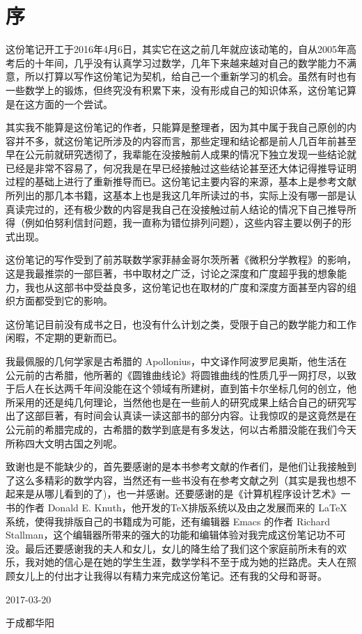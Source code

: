 
\chapter*{序}

这份笔记开工于2016年4月6日，其实它在这之前几年就应该动笔的，自从2005年高考后的十年间，几乎没有认真学习过数学，几年下来越来越对自己的数学能力不满意，所以打算以写作这份笔记为契机，给自己一个重新学习的机会。虽然有时也有一些数学上的锻炼，但终究没有积累下来，没有形成自己的知识体系，这份笔记算是在这方面的一个尝试。

其实我不能算是这份笔记的作者，只能算是整理者，因为其中属于我自己原创的内容并不多，就这份笔记所涉及的内容而言，那些定理和结论都是前人几百年前甚至早在公元前就研究透彻了，我辈能在没接触前人成果的情况下独立发现一些结论就已经是非常不容易了，何况我是在早已经接触过这些结论甚至还大体记得推导证明过程的基础上进行了重新推导而已。这份笔记主要内容的来源，基本上是参考文献所列出的那几本书籍，这基本上也是我这几年所读过的书，实际上没有哪一部是认真读完过的，还有极少数的内容是我自己在没接触过前人结论的情况下自己推导所得（例如伯努利信封问题，我一直称为错位排列问题），这些内容主要以例子的形式出现。

这份笔记的写作受到了前苏联数学家菲赫金哥尔茨所著《微积分学教程》的影响，这是我最推崇的一部巨著，书中取材之广泛，讨论之深度和广度超乎我的想象能力，我也从这部书中受益良多，这份笔记也在取材的广度和深度方面甚至内容的组织方面都受到它的影响。

这份笔记目前没有成书之日，也没有什么计划之类，受限于自己的数学能力和工作闲暇，不定期的更新而已。

我最佩服的几何学家是古希腊的 Apollonius，中文译作阿波罗尼奥斯，他生活在公元前的古希腊，他所著的《圆锥曲线论》将圆锥曲线的性质几乎一网打尽，以致于后人在长达两千年间没能在这个领域有所建树，直到笛卡尔坐标几何的创立，他所采用的还是纯几何理论，当然他也是在一些前人的研究成果上结合自己的研究写出了这部巨著，有时间会认真读一读这部书的部分内容。让我惊叹的是这竟然是在公元前的希腊完成的，古希腊的数学到底是有多发达，何以古希腊没能在我们今天所称四大文明古国之列呢。

致谢也是不能缺少的，首先要感谢的是本书参考文献的作者们，是他们让我接触到了这么多精彩的数学内容，当然还有一些书没有在参考文献之列（其实是我也想不起来是从哪儿看到的了)，也一并感谢。还要感谢的是《计算机程序设计艺术》一书的作者 Donald E. Knuth，他开发的\TeX 排版系统以及由之发展而来的 \LaTeX 系统，使得我排版自己的书籍成为可能，还有编辑器 Emacs 的作者 Richard Stallman，这个编辑器所带来的强大的功能和编辑体验对我完成这份笔记功不可没。最后还要感谢我的夫人和女儿，女儿的降生给了我们这个家庭前所未有的欢乐，我对她的信心是在她的学生生涯，数学学科不至于成为她的拦路虎。夫人在照顾女儿上的付出才让我得以有精力来完成这份笔记。还有我的父母和哥哥。

\vspace{1.5cm}

\hfill 2017-03-20 \ \ \ \ \ 

\hfill 于成都华阳 \ \ \ \ \ 


